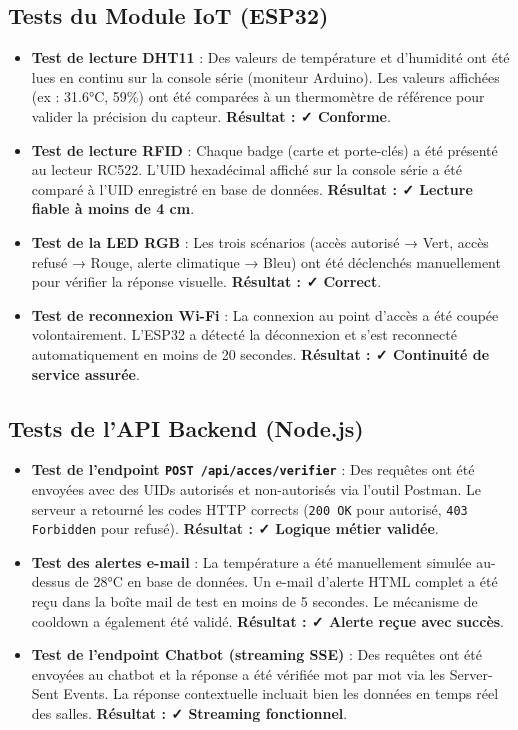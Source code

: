 \documentclass[12pt,a4paper]{report}
\begin{document}
\subsection{Tests du Module IoT (ESP32)}
\begin{itemize}
    \item \textbf{Test de lecture DHT11} : Des valeurs de température et d'humidité ont été lues en continu sur la console série (moniteur Arduino). Les valeurs affichées (ex : 31.6°C, 59\%) ont été comparées à un thermomètre de référence pour valider la précision du capteur. \textbf{Résultat : ✓ Conforme}.
    \item \textbf{Test de lecture RFID} : Chaque badge (carte et porte-clés) a été présenté au lecteur RC522. L'UID hexadécimal affiché sur la console série a été comparé à l'UID enregistré en base de données. \textbf{Résultat : ✓ Lecture fiable à moins de 4 cm}.
    \item \textbf{Test de la LED RGB} : Les trois scénarios (accès autorisé → Vert, accès refusé → Rouge, alerte climatique → Bleu) ont été déclenchés manuellement pour vérifier la réponse visuelle. \textbf{Résultat : ✓ Correct}.
    \item \textbf{Test de reconnexion Wi-Fi} : La connexion au point d'accès a été coupée volontairement. L'ESP32 a détecté la déconnexion et s'est reconnecté automatiquement en moins de 20 secondes. \textbf{Résultat : ✓ Continuité de service assurée}.
\end{itemize}

\subsection{Tests de l'API Backend (Node.js)}
\begin{itemize}
    \item \textbf{Test de l'endpoint \texttt{POST /api/acces/verifier}} : Des requêtes ont été envoyées avec des UIDs autorisés et non-autorisés via l'outil Postman. Le serveur a retourné les codes HTTP corrects (\texttt{200 OK} pour autorisé, \texttt{403 Forbidden} pour refusé). \textbf{Résultat : ✓ Logique métier validée}.
    \item \textbf{Test des alertes e-mail} : La température a été manuellement simulée au-dessus de 28°C en base de données. Un e-mail d'alerte HTML complet a été reçu dans la boîte mail de test en moins de 5 secondes. Le mécanisme de cooldown a également été validé. \textbf{Résultat : ✓ Alerte reçue avec succès}.
    \item \textbf{Test de l'endpoint Chatbot (streaming SSE)} : Des requêtes ont été envoyées au chatbot et la réponse a été vérifiée mot par mot via les Server-Sent Events. La réponse contextuelle incluait bien les données en temps réel des salles. \textbf{Résultat : ✓ Streaming fonctionnel}.
\end{itemize}
\end{document}
